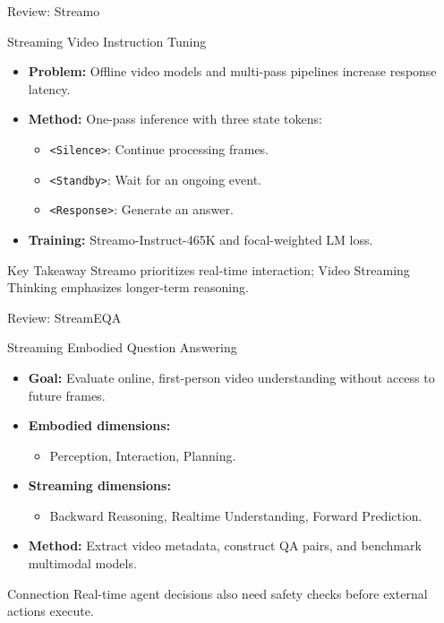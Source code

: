 \documentclass[aspectratio=169]{beamer}
\begin{document}
\begin{frame}{Review: Streamo}
    \begin{block}{Streaming Video Instruction Tuning}
        \begin{itemize}
            \item \textbf{Problem:} Offline video models and multi-pass pipelines increase response latency.
            \item \textbf{Method:} One-pass inference with three state tokens:
                \begin{itemize}
                    \item \texttt{<Silence>}: Continue processing frames.
                    \item \texttt{<Standby>}: Wait for an ongoing event.
                    \item \texttt{<Response>}: Generate an answer.
                \end{itemize}
            \item \textbf{Training:} Streamo-Instruct-465K and focal-weighted LM loss.
        \end{itemize}
    \end{block}
    \begin{block}{Key Takeaway}
        Streamo prioritizes real-time interaction; Video Streaming Thinking emphasizes longer-term reasoning.
    \end{block}
\end{frame}

\begin{frame}{Review: StreamEQA}
    \begin{block}{Streaming Embodied Question Answering}
        \begin{itemize}
            \item \textbf{Goal:} Evaluate online, first-person video understanding without access to future frames.
            \item \textbf{Embodied dimensions:}
                \begin{itemize}
                    \item Perception, Interaction, Planning.
                \end{itemize}
            \item \textbf{Streaming dimensions:}
                \begin{itemize}
                    \item Backward Reasoning, Realtime Understanding, Forward Prediction.
                \end{itemize}
            \item \textbf{Method:} Extract video metadata, construct QA pairs, and benchmark multimodal models.
        \end{itemize}
    \end{block}
    \begin{block}{Connection}
        Real-time agent decisions also need safety checks before external actions execute.
    \end{block}
\end{frame}
\end{document}
